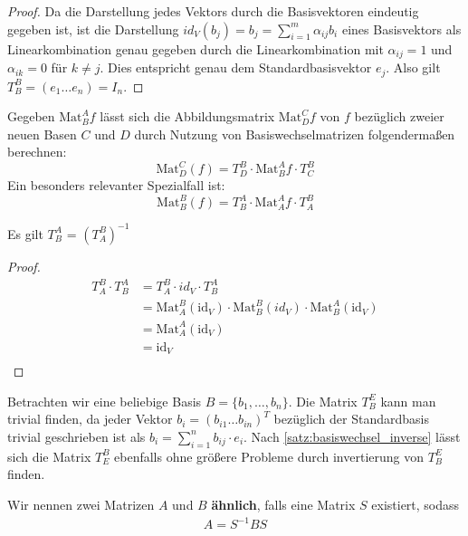 \documentclass{report}
\newcommand*{\newpar}{\par\vspace{\baselineskip}\noindent}
\begin{document}
%
%
%
\begin{proof}
Da die Darstellung jedes Vektors durch die Basisvektoren eindeutig gegeben ist, ist die Darstellung $id_V(b_j) = b_j = \sum_{i=1}^{m} \alpha_{ij} b_i$ eines Basisvektors als Linearkombination genau gegeben durch die Linearkombination mit $\alpha_{ij} = 1$ und $\alpha_{ik} = 0$ für $k \neq j$. Dies entspricht genau dem Standardbasisvektor $e_j$. Also gilt $T_B^B = (e_1 \hdots e_n) = I_n$.
\end{proof}
%
%
%
\begin{proposition}
\label{prop:basiswechsel}
Gegeben $\text{Mat}_B^A f$ lässt sich die Abbildungsmatrix $\text{Mat}_D^C f$ von $f$ bezüglich zweier neuen Basen $C$ und $D$ durch Nutzung von Basiswechselmatrizen folgendermaßen berechnen:
\begin{equation}
 \text{Mat}_D^C(f) = T_D^B \cdot \text{Mat}_B^A f \cdot T_C^B
\end{equation}
Ein besonders relevanter Spezialfall ist:
\begin{equation}
 \text{Mat}_B^B(f) = T_B^A \cdot \text{Mat}_A^A f \cdot T_A^B
\end{equation}
\end{proposition}
%
\newpar
%
\begin{theorem}
\label{satz:basiswechsel_inverse}
Es gilt $T_B^A$ = $(T_A^B)^{-1}$
\end{theorem}
\begin{proof}
\begin{align*}
T_A^B \cdot T_B^A &= T_A^B \cdot id_V \cdot T_B^A\\
                  &=\text{Mat}_A^B (\text{id}_V) \cdot \text{Mat}_B^B (id_V) \cdot \text{Mat}_B^A (\text{id}_V)\\
                  &= \text{Mat}_A^A (\text{id}_V)\\
                  &= \text{id}_V\\
\end{align*}
\end{proof}
%
\newpar
%
\begin{anmerkung}
Betrachten wir eine beliebige Basis $B = \{b_1, \hdots, b_n\}$. Die Matrix $T_B^E$ kann man trivial finden, da jeder Vektor $b_i = (b_{i1} \hdots b_{in})^T$ bezüglich der Standardbasis trivial geschrieben ist als $b_i = \sum_{i=1}^n b_{ij} \cdot e_i$. Nach \ref{satz:basiswechsel_inverse} lässt sich die Matrix $T_E^B$ ebenfalls ohne größere Probleme durch invertierung von $T_B^E$ finden.
\end{anmerkung}
%
\begin{definition}
 Wir nennen zwei Matrizen $A$ und $B$ \textbf{ähnlich}, falls eine Matrix $S$ existiert, sodass
 \begin{align*}
  A = S^{-1} B S
 \end{align*}
\end{definition}
\end{document}
